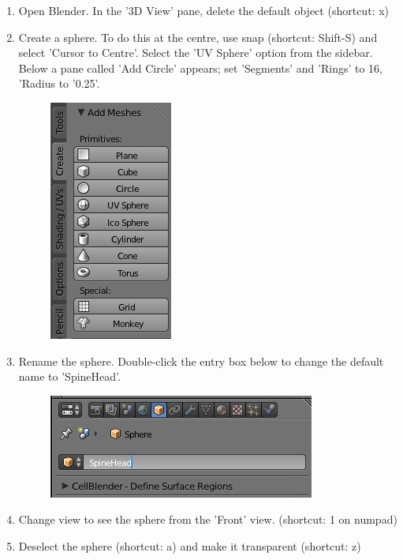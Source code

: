 \documentclass[twoside,a4paper]{refart}
\begin{document}
\begin{enumerate}

\item   Open Blender. In the '3D View' pane, delete the default object (shortcut: x)
    
\item   Create a sphere. To do this at the centre, use snap (shortcut: Shift-S) and select 'Cursor to Centre'. Select the 'UV Sphere' option from the sidebar. Below a pane called 'Add Circle' appears; set 'Segments' and 'Rings' to 16, 'Radius to '0.25'. 
        \begin{figure}[H]
        \includegraphics[scale=0.5]{spinehead1.png}
        \end{figure}

\item   Rename the sphere. Double-click the entry box below to change the default name to 'SpineHead'.
        \begin{figure}[H]
        \includegraphics[scale=0.5]{spinehead2.png}
        \end{figure}

\item   Change view to see the sphere from the 'Front' view. (shortcut: 1 on numpad)

\item   Deselect the sphere (shortcut: a) and make it transparent (shortcut: z)


\end{enumerate}
\end{document}
